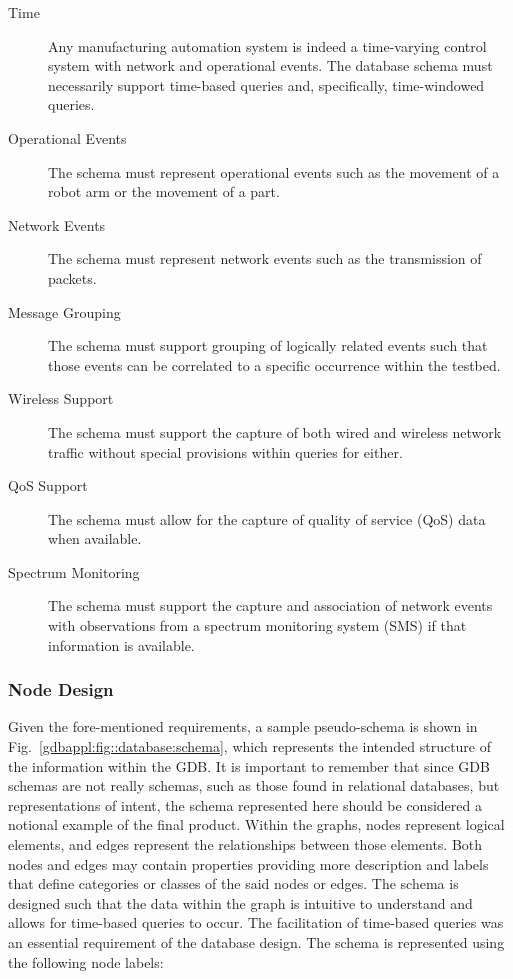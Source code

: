 \begin{description}%
\item[Time] Any manufacturing automation system is indeed a time-varying control system with network and operational events.  The database schema must necessarily support time-based queries and, specifically, time-windowed 
queries.
\item[Operational Events] The schema must represent operational events such as the movement of a robot arm or the movement of a part.
\item[Network Events] The schema must represent network events such as the transmission of packets.
\item[Message Grouping]  The schema must support grouping of logically related events such that those events can be correlated to a specific occurrence within the testbed.
\item[Wireless Support] The schema must support the capture of both wired and wireless network traffic without special provisions within queries for either.
\item[QoS Support] The schema must allow for the capture of quality of service (QoS) data when available.
\item[Spectrum Monitoring] The schema must support the capture and association of network events with observations from a spectrum monitoring system (SMS) if that information is available.
\end{description}

\subsubsection{Node Design}

Given the fore-mentioned requirements, a sample pseudo-schema is shown in Fig.~\ref{gdbappl:fig::database:schema}, which represents the intended structure of the information within the GDB. It is important to remember that since GDB schemas are not really schemas, such as those found in relational databases, but representations of intent, the schema represented here should be considered a notional example of the final product.  Within the graphs, nodes represent logical elements, and edges represent the relationships between those elements.  Both nodes and edges may contain properties providing more description and labels that define categories or classes of the said nodes or edges.  The schema is designed such that the data within the graph is intuitive to understand and allows for time-based queries to occur.  The facilitation of time-based queries was an essential requirement of the database design.  The schema is represented using the following node labels:

